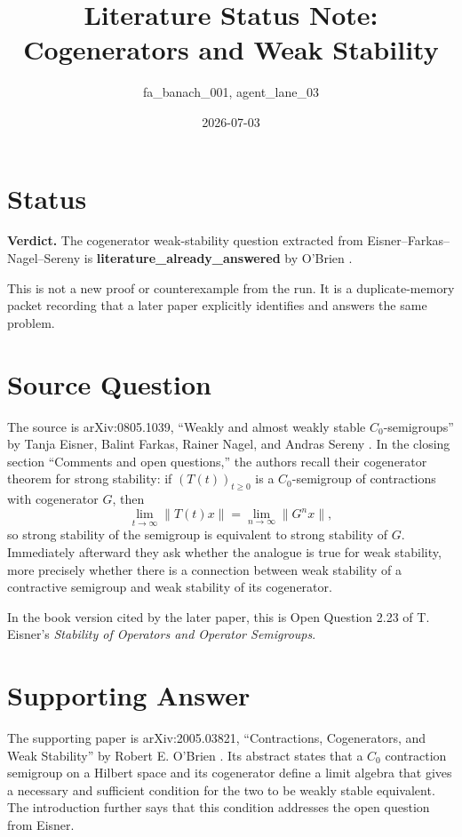 \documentclass[11pt]{amsart}
\title{Literature Status Note: Cogenerators and Weak Stability}
\author{fa\_banach\_001, agent\_lane\_03}
\date{2026-07-03}
\begin{document}
\maketitle

\section*{Status}

\textbf{Verdict.} The cogenerator weak-stability question extracted from
Eisner--Farkas--Nagel--Sereny \cite{EFNS2008} is
\textbf{literature\_already\_answered} by O'Brien \cite{OBrien2020}.

This is not a new proof or counterexample from the run. It is a duplicate-memory
packet recording that a later paper explicitly identifies and answers the same
problem.

\section*{Source Question}

The source is arXiv:0805.1039, ``Weakly and almost weakly stable
$C_0$-semigroups'' by Tanja Eisner, Balint Farkas, Rainer Nagel, and Andras
Sereny \cite{EFNS2008}. In the closing section ``Comments and open questions,''
the authors recall their cogenerator theorem for strong stability: if
$(T(t))_{t \geq 0}$ is a $C_0$-semigroup of contractions with cogenerator $G$,
then
\[
  \lim_{t\to\infty}\|T(t)x\|
  =
  \lim_{n\to\infty}\|G^n x\|,
\]
so strong stability of the semigroup is equivalent to strong stability of $G$.
Immediately afterward they ask whether the analogue is true for weak stability,
more precisely whether there is a connection between weak stability of a
contractive semigroup and weak stability of its cogenerator.

In the book version cited by the later paper, this is Open Question 2.23 of
T. Eisner's \emph{Stability of Operators and Operator Semigroups}.

\section*{Supporting Answer}

The supporting paper is arXiv:2005.03821, ``Contractions, Cogenerators, and
Weak Stability'' by Robert E. O'Brien \cite{OBrien2020}. Its abstract states
that a $C_0$ contraction semigroup on a Hilbert space and its cogenerator define
a limit algebra that gives a necessary and sufficient condition for the two to
be weakly stable equivalent. The introduction further says that this condition
addresses the open question from Eisner.
\end{document}
